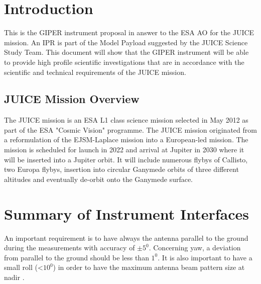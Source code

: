 \section{Introduction}
\label{sec:introduction}
%
This is the \ac{GIPER} instrument proposal in answer to the \ac{ESA} \ac{AO}\cite{JUICE_AO} for the \ac{JUICE} mission. An \ac{IPR} is part of the Model Payload suggested by the  JUICE Science Study Team\cite{yellowbook}. This document will show that the \ac{GIPER} instrument will be able to provide high profile scientific investigations that are in accordance with the scientific and technical requirements of the \ac{JUICE} mission.
%
\subsection{JUICE Mission Overview}
The \ac{JUICE} mission is an \ac{ESA} L1 class science mission selected in May 2012 as part of the \ac{ESA} "Cosmic Vision" programme. The \ac{JUICE} mission originated from a reformulation of the EJSM-Laplace mission into a European-led mission. The mission is scheduled for launch in 2022 and arrival at Jupiter in 2030 where it will be inserted into a Jupiter orbit. It will include numerous flybys of Callisto, two Europa flybys, insertion into circular Ganymede orbits of three different altitudes and eventually de-orbit onto the Ganymede surface. 
%
%
%

%
%

%
%
\section{Summary of Instrument Interfaces}
An important requirement is to have always the antenna parallel to the ground during the measurements with accuracy of $\pm 5^{0}$. Concerning yaw, a deviation from parallel to the ground should be less than $1^{0}$. It is also important to have a small roll (<$ 10^{0}$) in order to have the maximum antenna beam pattern size at nadir \cite{yellowbook}.
%
